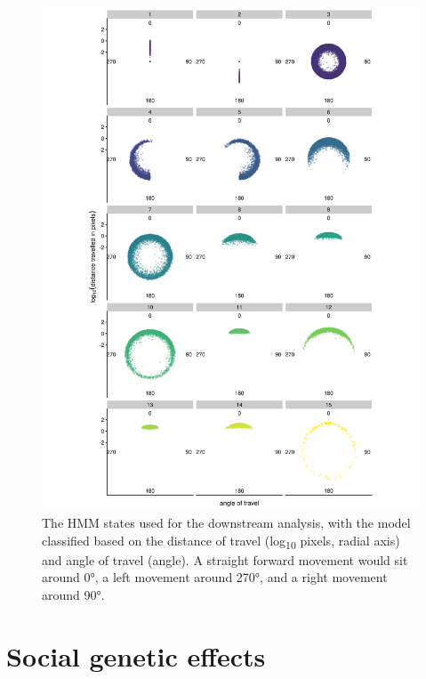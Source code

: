 \documentclass[
]{book}
\begin{document}
\begin{figure}
\includegraphics[width=1\linewidth]{figs/mikk_behaviour/0.08_15_polar_all_dge} \caption{The HMM states used for the downstream analysis, with the model classified based on the distance of travel (log\textsubscript{10} pixels, radial axis) and angle of travel (angle). A straight forward movement would sit around 0°, a left movement around 270°, and a right movement around 90°.}\label{fig:mikk-hmm-sym}
\end{figure}

\hypertarget{social-genetic-effects-1}{%
\section{Social genetic effects}\label{social-genetic-effects-1}}
\end{document}
